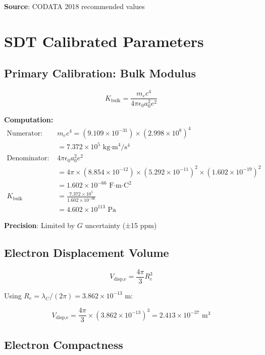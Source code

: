 \documentclass{article}
\begin{document}
\textbf{Source}: CODATA 2018 recommended values \cite{codata2018}

\section{SDT Calibrated Parameters}

\subsection{Primary Calibration: Bulk Modulus}

\begin{equation}
K_{\text{bulk}} = \frac{m_e c^4}{4\pi \epsilon_0 a_0^2 e^2}
\end{equation}

\textbf{Computation:}
\begin{align}
\text{Numerator: } &m_e c^4 = (9.109 \times 10^{-31}) \times (2.998 \times 10^8)^4 \\
&= 7.372 \times 10^5 \text{ kg·m}^4/\text{s}^4 \\
\text{Denominator: } &4\pi \epsilon_0 a_0^2 e^2 \\
&= 4\pi \times (8.854 \times 10^{-12}) \times (5.292 \times 10^{-11})^2 \times (1.602 \times 10^{-19})^2 \\
&= 1.602 \times 10^{-66} \text{ F·m·C}^2 \\
K_{\text{bulk}} &= \frac{7.372 \times 10^5}{1.602 \times 10^{-66}} \\
&= \boxed{4.602 \times 10^{113} \text{ Pa}}
\end{align}

\textbf{Precision}: Limited by $G$ uncertainty (±15 ppm)

\subsection{Electron Displacement Volume}

\begin{equation}
V_{\text{disp,e}} = \frac{4\pi}{3} R_e^3
\end{equation}

Using $R_e = \lambda_C / (2\pi) = 3.862 \times 10^{-13}$ m:

\begin{equation}
V_{\text{disp,e}} = \frac{4\pi}{3} \times (3.862 \times 10^{-13})^3 = 2.413 \times 10^{-37} \text{ m}^3
\end{equation}

\subsection{Electron Compactness}
\end{document}
